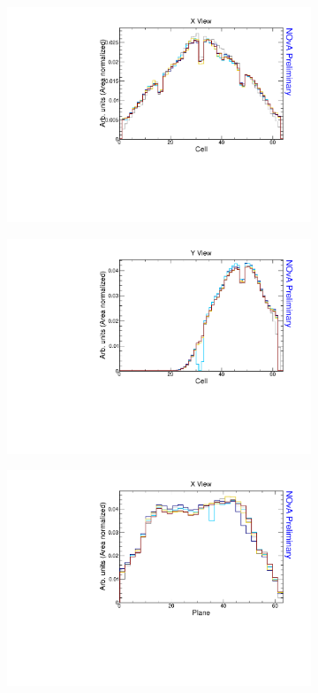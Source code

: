 \begin{figure}[ht!]
\begin{subfigure}{0.495\textwidth}
  \end{subfigure}
  \begin{subfigure}{0.495\textwidth}
    \includegraphics[width=\linewidth]{essentialsec_tb/nhits_cell_x.pdf}
  \end{subfigure}
  \begin{subfigure}{0.495\textwidth}
    \includegraphics[width=\linewidth]{essentialsec_tb/nhits_cell_y.pdf}
  \end{subfigure}
  \begin{subfigure}{0.495\textwidth}
    \includegraphics[width=\linewidth]{essentialsec_tb/nhits_plane_x.pdf}

\end{subfigure}
\end{figure}
